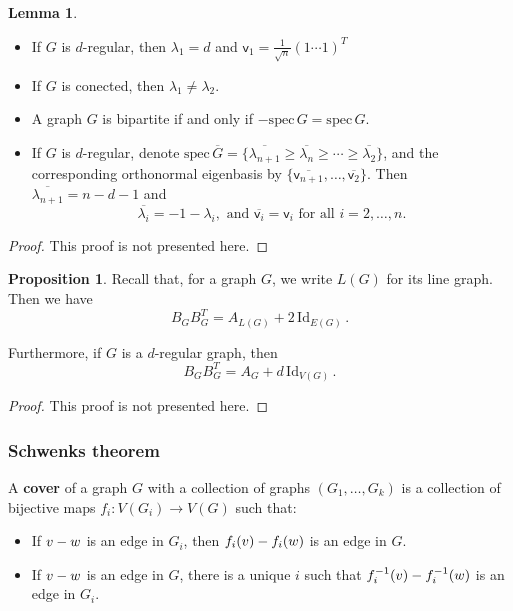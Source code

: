 \documentclass[12pt]{amsart}
\theoremstyle{definition}
\newtheorem{prop}[thm]{Proposition}
\newtheorem{lm}[thm]{Lemma}
\newcommand{\vv}{\mathsf{v}}
\newcommand{\Id}{\mathrm{Id}}
\newcommand{\spec}{\mathrm{spec} }
\begin{document}
\begin{lm}\label{lm:prelspec}
\begin{itemize}
The following facts help us compute the spectrum of graphs: 

\item If $G$ is $d$-regular, then $\lambda_1 = d$ and $\vv_1 = \frac{1}{\sqrt{n}}(1 \cdots 1)^T$

\item If $G$ is conected, then $\lambda_1 \neq \lambda_2$.

\item A graph $G$ is bipartite if and only if $-\spec \, G = \spec \, G$.

\item If $G$ is $d$-regular, denote $\spec \, \overline{G} = \{\overline{\lambda_{n+1}} \geq \overline{\lambda_{n}} \geq \cdots \geq \overline{\lambda_2}\}$, and the corresponding orthonormal eigenbasis by $\{ \overline{\vv_{n+1}}, \ldots, \overline{\vv_2} \}$.
Then 
$\overline{\lambda_{n+1}} = n - d - 1$ and 
$$\overline{\lambda_i} = -1 - \lambda_i, \text{ and }  \overline{\vv_i} = \vv_i \text{ for all $i = 2, \ldots , n$.}$$
\end{itemize}
\end{lm}

\begin{proof}
This proof is not presented here.
\end{proof}

\begin{prop}
Recall that, for a graph $G$, we write $L(G)$ for its line graph.
Then we have
$$B_G B_G^T = A_{L(G)} + 2\, \Id_{E(G)} \, .$$

Furthermore, if $G$ is a $d$-regular graph, then
$$B_G B_G^T = A_G + d\, \Id_{V(G)}\, . $$
\end{prop}

\begin{proof}
This proof is not presented here.
\end{proof}


\subsubsection*{Schwenks theorem}

A \textbf{cover} of a graph $G$ with a collection of graphs $(G_1, \ldots , G_k)$ is a collection of bijective maps $f_i: V(G_i) \to V(G)$ such that:
\begin{itemize}
\item If $v \-- w$ is an edge in $G_i$, then $f_i(v) \-- f_i(w)$ is an edge in $G$.

\item If $v \-- w $ is an edge in $G$, there is a unique $i$ such that $f_i^{-1}(v) \-- f_i^{-1}(w)$ is an edge in $G_i$.
\end{itemize}
\end{document}

